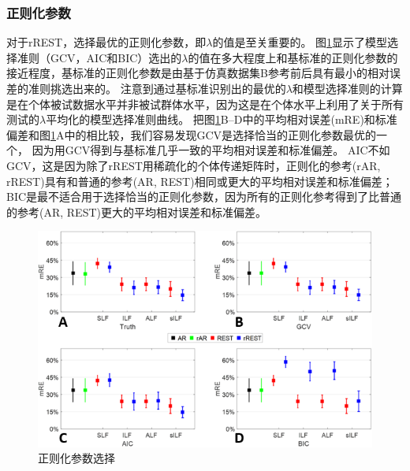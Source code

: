 \subsubsection{正则化参数}
对于rREST，选择最优的正则化参数，即$\lambda$的值是至关重要的。 图\ref{3.6}显示了模型选择准则（GCV，AIC和BIC）选出的$\lambda$的值在多大程度上和基标准的正则化参数的接近程度，基标准的正则化参数是由基于仿真数据集B参考前后具有最小的相对误差的准则挑选出来的。 注意到通过基标准识别出的最优的$\lambda$和模型选择准则的计算是在个体被试数据水平并非被试群体水平，因为这是在个体水平上利用了关于所有测试的$\lambda$平均化的模型选择准则曲线。 把图\ref{3.6}B–D中的平均相对误差(mRE)和标准偏差和图\ref{3.6}A中的相比较，我们容易发现GCV是选择恰当的正则化参数最优的一个，
因为用GCV得到与基标准几乎一致的平均相对误差和标准偏差。 AIC不如GCV，这是因为除了rREST用稀疏化的个体传递矩阵时，正则化的参考(rAR, rREST)具有和普通的参考(AR, REST)相同或更大的平均相对误差和标准偏差； BIC是最不适合用于选择恰当的正则化参数，因为所有的正则化参考得到了比普通的参考(AR, REST)更大的平均相对误差和标准偏差。
\begin{figure}[!ht]
	\centering
	\includegraphics[width=15cm]{pic/Frontier/figure6.png}
	\caption{正则化参数选择}
	\label{3.6}
\end{figure}

